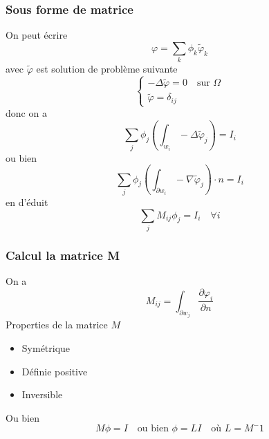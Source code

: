 \begin{frame}
\frametitle{Sous forme de matrice}
On peut \'ecrire
 \begin{equation}
 \varphi = \sum_k \phi_k \tilde{\varphi}_k
 \end{equation}
 avec $\tilde{\varphi}$ est solution de probl\`eme suivante 
 \begin{equation}
 \begin{cases}
 -\Delta\tilde{\varphi} = 0 \quad \text{sur } \Omega \\
 \tilde{\varphi} = \delta_{ij} 
 \end{cases}
 \end{equation}
 donc on a
 \begin{equation}
 \sum_j \phi_j \left( \int_{w_i}-\Delta\tilde{\varphi}_j \right) =I_i
 \end{equation}
 ou bien
 \begin{equation}
  \sum_j \phi_j \left( \int_{\partial w_i}-\nabla\tilde{\varphi}_j \right) \cdot n =I_i
 \end{equation}
 en d'\'eduit
  \begin{equation}
  \sum_j M_{ij}\phi_j =I_i \quad \forall i 
 \end{equation}
%


\end{frame} 

 \begin{frame}
\frametitle{Calcul la matrice M}
On a
\begin{equation}
  M_{ij} = \int_{\partial w_j} \frac{\partial\varphi_i}{\partial n}
\end{equation}
 Properties de la matrice $M$
 \begin{itemize}
 \item Sym\'etrique 
 \item D\'efinie positive
 \item Inversible
 \end{itemize}
 Ou bien
\begin{equation}
  M\phi =I \quad \text{ou bien } \phi =LI \quad \text{o\`u } L=M^-1 
\end{equation}


\end{frame} 

